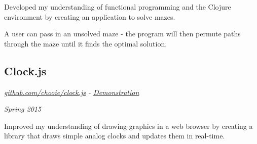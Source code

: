 Developed my understanding of functional programming and the Clojure environment
by creating an application to solve mazes.

A user can pass in an unsolved maze - the program will then permute paths
through the maze until it finds the optimal solution.

\subsection*{Clock.js}
\noindent\begin{minipage}[b]{0.5\textwidth}
  \flushleft
  \emph{
    \href{https://github.com/chooie/clock.js} {github.com/chooie/clock.js} -
    \href {https://chooie.github.io/clock.js} {Demonstration}
  }
\end{minipage}
\noindent\begin{minipage}[b]{0.5\textwidth}
  \flushright
  \emph{Spring 2015}
\end{minipage}

Improved my understanding of drawing graphics in a web browser by creating a
library that draws simple analog clocks and updates them in real-time.

